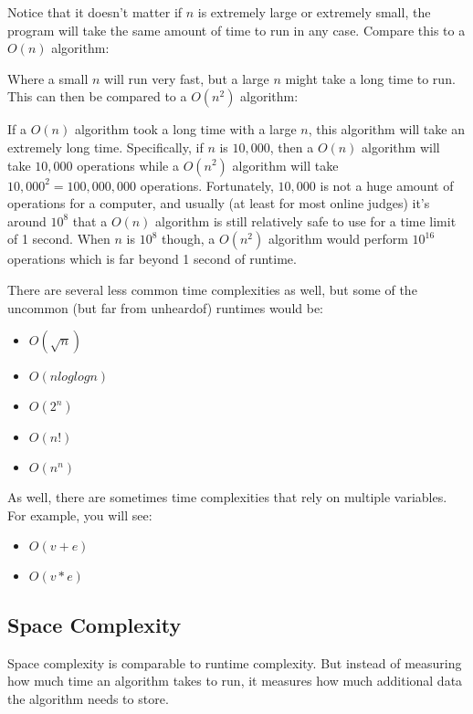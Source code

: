 
Notice that it doesn't matter if $n$ is extremely large or extremely small, the program will take the same amount of time to run in any case. Compare this to a $O(n)$ algorithm:


Where a small $n$ will run very fast, but a large $n$ might take a long time to run. This can then be compared to a $O(n^2)$ algorithm:


If a $O(n)$ algorithm took a long time with a large $n$, this algorithm will take an extremely long time. Specifically, if $n$ is $10,000$, then a $O(n)$ algorithm will take $10,000$ operations while a $O(n^2)$ algorithm will take $10,000^2 = 100,000,000$ operations. Fortunately, $10,000$ is not a huge amount of operations for a computer, and usually (at least for most online judges) it's around $10^8$ that a $O(n)$ algorithm is still relatively safe to use for a time limit of 1 second. When $n$ is $10^8$ though, a $O(n^2)$ algorithm would perform $10^{16}$ operations which is far beyond 1 second of runtime.

There are several less common time complexities as well, but some of the uncommon (but far from unheardof) runtimes would be:

\begin{itemize}
\item $O(\sqrt{n})$
\item $O(n log log n)$
\item $O(2^n)$
\item $O(n!)$
\item $O(n^n)$
\end{itemize}

As well, there are sometimes time complexities that rely on multiple variables. For example, you will see:

\begin{itemize}
\item $O(v + e)$
\item $O(v * e)$
\end{itemize}

\subsection{Space Complexity}

Space complexity is comparable to runtime complexity. But instead of measuring how much time an algorithm takes to run, it measures how much additional data the algorithm needs to store.

